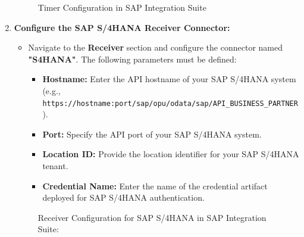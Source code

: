 \begin{enumerate}
    \begin{figure}[H]
    \centering
    \caption{Timer Configuration in SAP Integration Suite}
    
    \end{figure}

    \item \textbf{Configure the SAP S/4HANA Receiver Connector:}
    \begin{itemize}
        \item Navigate to the \textbf{Receiver} section and configure the connector named \textbf{"S4HANA"}. The following parameters must be defined:
        \begin{itemize}
            \item \textbf{Hostname:} Enter the API hostname of your SAP S/4HANA system (e.g., \texttt{https://hostname:port/sap/opu/odata/sap/API\_BUSINESS\_PARTNER}).
            \item \textbf{Port:} Specify the API port of your SAP S/4HANA system.
            \item \textbf{Location ID:} Provide the location identifier for your SAP S/4HANA tenant.
            \item \textbf{Credential Name:} Enter the name of the credential artifact deployed for SAP S/4HANA authentication.
        \end{itemize}
    \end{itemize}


    \begin{figure}[H]
    \centering
    \caption{Receiver Configuration for SAP S/4HANA in SAP Integration Suite:}
    

\end{figure}
\end{enumerate}
